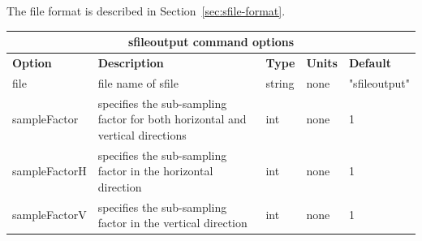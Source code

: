\documentclass[11pt]{report}
\begin{document}
{The file format is described in Section~\ref{sec:sfile-format}.
%
\begin{center}
	\begin{tabular}{|l|p{8cm}|l|l|l|} \hline
		\multicolumn{5}{|c|}{\bf sfileoutput command options}                                                                                    \\ \hline
		{\bf Option}  & {\bf Description}                                                             & {\bf Type} & {\bf Units} & {\bf Default} \\ \hline
		\hline
		file          & file name of sfile                                                            & string     & none        & "sfileoutput" \\ \hline
		sampleFactor  & specifies the sub-sampling factor for both horizontal and vertical directions & int        & none        & 1             \\  \hline
		sampleFactorH & specifies the sub-sampling factor in the horizontal direction                 & int        & none        & 1             \\  \hline
		sampleFactorV & specifies the sub-sampling factor in the vertical direction                   & int        & none        & 1             \\  \hline
	\end{tabular}
\end{center}
%

}
\end{document}
